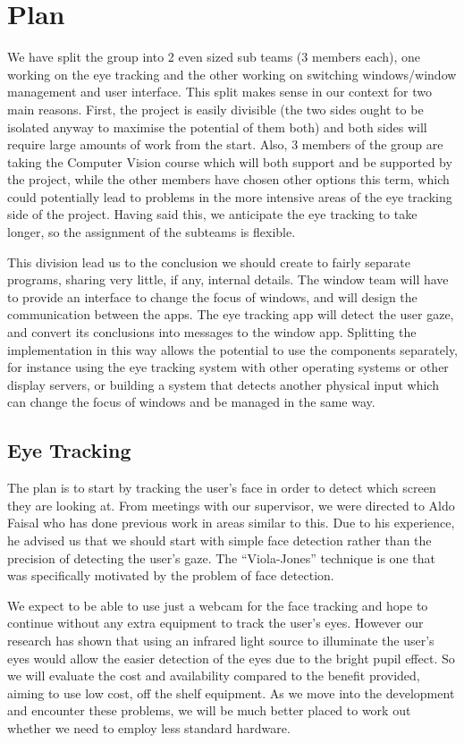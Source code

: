 \documentclass{article}
\begin{document}
\section*{Plan}
We have split the group into 2 even sized sub teams (3 members each), one working on the eye tracking and the other working on switching windows/window management and user interface. This split makes sense in our context for two main reasons. First, the project is easily divisible (the two sides ought to be isolated anyway to maximise the potential of them both) and both sides will require large amounts of work from the start. Also, 3 members of the group are taking the Computer Vision course which will both support and be supported by the project, while the other members have chosen other options this term, which could potentially lead to problems in the more intensive areas of the eye tracking side of the project. Having said this, we anticipate the eye tracking to take longer, so the assignment of the subteams is flexible. 

This division lead us to the conclusion we should create to fairly separate programs, sharing very little, if any, internal details. The window team will have to provide an interface to change the focus of windows, and will design the communication between the apps. The eye tracking app will detect the user gaze, and convert its conclusions into messages to the window app. Splitting the implementation in this way allows the potential to use the components separately, for instance using the eye tracking system with other operating systems or other display servers, or building a system that detects another physical input which can change the focus of windows and be managed in the same way. 

\subsection*{Eye Tracking}
The plan is to start by tracking the user's face in order to detect which screen they are looking at. From meetings with our supervisor, we were directed to Aldo Faisal who has done previous work in areas similar to this. Due to his experience, he advised us that we should start with simple face detection rather than the precision of detecting the user’s gaze.  The “Viola-Jones” technique is one that was specifically motivated by the problem of face detection.

We expect to be able to use just a webcam for the face tracking and hope to continue without any extra equipment to track the user’s eyes. However our research has shown that using an infrared light source to illuminate the user’s eyes would allow the easier detection of the eyes due to the bright pupil effect. So we will evaluate the cost and availability compared to the benefit provided, aiming to use low cost, off the shelf equipment. As we move into the development and encounter these problems, we will be much better placed to work out whether we need to employ less standard hardware.
\end{document}
